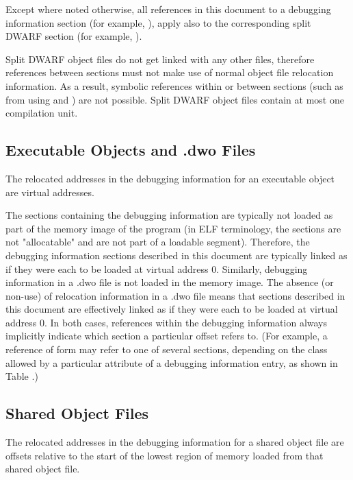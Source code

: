 Except where noted otherwise, all references in this document
to a debugging information section (for example, \dotdebuginfo),
apply also to the corresponding split DWARF section (for example,
\dotdebuginfodwo).

Split DWARF object files do not get linked with any other files,
therefore references between sections must not make use of
normal object file relocation information. As a result, symbolic
references within or between sections 
\bb
(such as from using \DWFORMrefaddr{} and \DWOPcallref)
\eb
are not possible.
\bb
Split DWARF object files contain at most one compilation unit.
\eb

\bb
\subsection{Executable Objects and .dwo Files}
\label{datarep:executableobjectsanddwofiles}
\eb
The relocated addresses in the debugging information for an
executable object are virtual addresses.

The sections containing the debugging information are typically
not loaded as part of the memory image of the program (in ELF
terminology, the sections are not "allocatable" and are not part
of a loadable segment). Therefore, the debugging information
sections described in this document are typically linked as if
they were each to be loaded at virtual address 0.
\bb
Similarly,
debugging information in a .dwo file is not loaded in the memory image.
The absence (or non-use) of relocation information in a .dwo file means
that sections described in this document are effectively linked as if
they were each to be loaded at virtual address 0.
In both cases, references
\eb
within the debugging information always implicitly indicate which
section a particular offset refers to. (For example, a reference
of form \DWFORMsecoffset{} may refer to one of several sections,
depending on the class allowed by a particular attribute of a
debugging information entry, as shown in 
Table .)

\subsection{Shared Object Files}
\label{datarep:sharedobjectfiles}
The relocated
addresses in the debugging information for a shared object file
are offsets relative to the start of the lowest region of
memory loaded from that shared object file.

